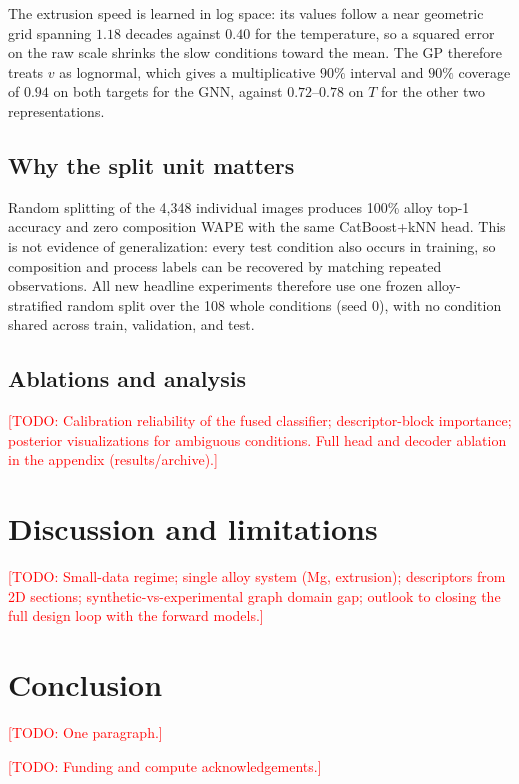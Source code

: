 \documentclass{article}
\newcommand{\todo}[1]{\textcolor{red}{[TODO: #1]}}
\begin{document}
The extrusion speed is learned in log space: its values follow a near
geometric grid spanning $1.18$ decades against $0.40$ for the temperature, so a
squared error on the raw scale shrinks the slow conditions toward the mean.
The GP therefore treats $v$ as lognormal, which gives a multiplicative
$90\%$ interval and $90\%$ coverage of $0.94$ on both targets for the GNN,
against $0.72$--$0.78$ on $T$ for the other two representations.

\subsection{Why the split unit matters}
Random splitting of the 4,348 individual images produces 100\%
alloy top-1 accuracy and zero composition WAPE with the same
CatBoost{+}kNN head. This is not evidence of generalization: every test
condition also occurs in training, so composition and process labels can be
recovered by matching repeated observations. All new headline experiments
therefore use one frozen alloy-stratified random split over the 108 whole
conditions (seed 0), with no condition shared across train, validation, and
test.

\subsection{Ablations and analysis}
\todo{Calibration reliability of the fused classifier; descriptor-block
importance; posterior visualizations for ambiguous conditions. Full head and
decoder ablation in the appendix (results/archive).}

\section{Discussion and limitations}
\label{sec:discussion}
\todo{Small-data regime; single alloy system (Mg, extrusion); descriptors from
2D sections; synthetic-vs-experimental graph domain gap; outlook to closing the
full design loop with the forward models.}

\section{Conclusion}
\label{sec:conclusion}
\todo{One paragraph.}

\begin{ack}
\todo{Funding and compute acknowledgements.}
\end{ack}



\end{document}
